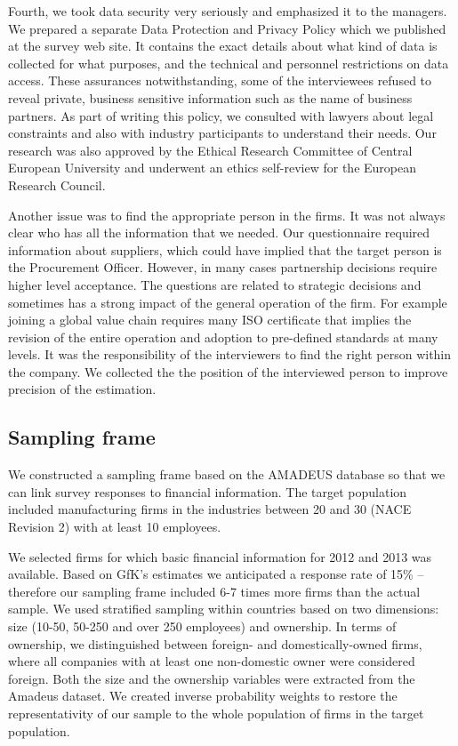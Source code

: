 \documentclass[final, dvipsnames, authoryear,12pt]{elsarticle}
\begin{document}
Fourth, we took data security very seriously and emphasized it to the managers. We prepared a separate Data Protection and Privacy Policy which we published at the survey web site.  It contains the exact details about what kind of data is collected for what purposes, and the technical and personnel restrictions on data access. These assurances notwithstanding, some of the interviewees refused to reveal private, business sensitive information such as the name of business partners. As part of writing this policy, we consulted with lawyers about legal constraints and also with industry participants to understand their needs. Our research was also approved by the Ethical Research Committee of Central European University and underwent an ethics self-review for the European Research Council.   

Another issue was to find the appropriate person in the firms. It was not always clear who has all the information that we needed. Our questionnaire required information about suppliers, which could have implied that the target person is the Procurement Officer. However, in many cases partnership decisions require higher level acceptance. The questions are related to strategic decisions and sometimes has a strong impact of the general operation of the firm. For example joining a global value chain requires many ISO certificate that implies the revision of the entire operation and adoption to pre-defined standards at many levels. It was the responsibility of the interviewers to find the right person within the company. We collected the the position of the interviewed person to improve precision of the estimation.


\subsection{Sampling frame}

We constructed a sampling frame based on the AMADEUS database \citep{amadeus} so that we can link survey responses to financial information. The target population included manufacturing firms in the industries between 20 and 30 (NACE Revision 2) with at least 10 employees.

We selected firms for which basic financial information for 2012 and 2013 was available. Based on GfK's estimates we anticipated a response rate of 15\% -- therefore our sampling frame included 6-7 times more firms than the actual sample. We used stratified sampling within countries based on two dimensions: size (10-50, 50-250 and over 250 employees) and ownership. In terms of ownership, we distinguished between foreign- and domestically-owned firms, where all companies with at least one non-domestic owner were considered  foreign. Both the size and the ownership variables were extracted from the Amadeus dataset. We created inverse probability weights to restore the representativity of our sample to the whole population of firms in the target population.
\end{document}
